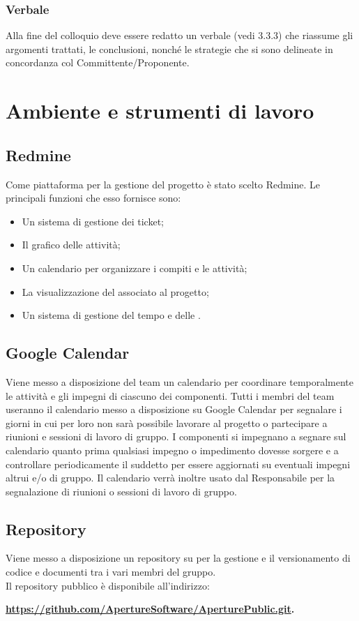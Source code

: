 \subsubsection{Verbale}
\label{3.4.3}
Alla fine del colloquio deve essere redatto un verbale (vedi 3.3.3) che riassume gli argomenti trattati, le conclusioni, nonché le strategie che si sono delineate in concordanza col Committente/Proponente.

\newpage
\section{Ambiente e strumenti di lavoro}
\label{4.0}

\subsection{Redmine}
\label{4.1}
Come piattaforma per la gestione del progetto è stato scelto Redmine. Le principali funzioni che esso fornisce sono:
\begin{itemize}
\item Un sistema di gestione dei ticket;
\item Il grafico  delle attività;
\item Un calendario per organizzare i compiti e le attività;
\item La visualizzazione del  associato al progetto;
\item Un sistema di  gestione del tempo e delle .
\end{itemize}

\subsection{Google Calendar}
\label{4.2}
Viene messo a disposizione del team un calendario per coordinare temporalmente le attività e gli impegni di ciascuno dei componenti.
Tutti i membri del team useranno il calendario messo a disposizione su Google Calendar per segnalare i giorni in cui per loro non sarà possibile lavorare al progetto o partecipare a riunioni e sessioni di lavoro di gruppo. I componenti si impegnano a segnare sul calendario quanto prima qualsiasi impegno o impedimento dovesse sorgere e a controllare periodicamente il suddetto per essere aggiornati su eventuali impegni altrui e/o di gruppo.
Il calendario verrà inoltre usato dal Responsabile per la segnalazione di riunioni o sessioni di lavoro di gruppo.

\subsection{Repository}
\label{4.3}
Viene messo a disposizione un repository  su  per la gestione e il versionamento di codice e documenti tra i vari membri del gruppo.\\
Il repository pubblico è disponibile all'indirizzo: \\
\begin{center}
\textbf{\url{https://github.com/ApertureSoftware/AperturePublic.git}.}
\end{center}

